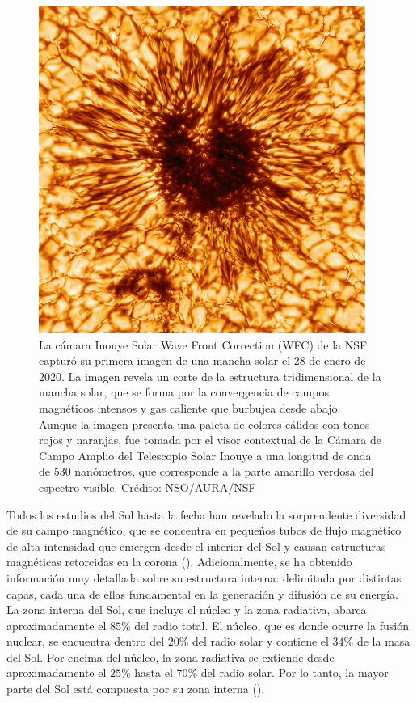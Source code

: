 \begin{figure}
    \centering
    \includegraphics[width=0.6\linewidth]{Figs/sunspot_small.png}
    \caption{La cámara Inouye Solar Wave Front Correction (WFC) de la NSF capturó su primera imagen de una mancha solar el 28 de enero de 2020. La imagen revela un corte de la estructura tridimensional de la mancha solar, que se forma por la convergencia de campos magnéticos intensos y gas caliente que burbujea desde abajo. Aunque la imagen presenta una paleta de colores cálidos con tonos rojos y naranjas, fue tomada por el visor contextual de la Cámara de Campo Amplio del Telescopio Solar Inouye a una longitud de onda de 530 nanómetros, que corresponde a la parte amarillo verdosa del espectro visible. Crédito: NSO/AURA/NSF}
    \label{fig:sunspotNSO}
\end{figure}

Todos los estudios del Sol hasta la fecha han revelado la sorprendente diversidad de su campo magnético, que se concentra en pequeños tubos de flujo magnético de alta intensidad que emergen desde el interior del Sol y causan estructuras magnéticas retorcidas en la corona (\cite{schrijver_2009}). Adicionalmente, se ha obtenido información muy detallada sobre su estructura interna: delimitada por distintas capas, cada una de ellas fundamental en la generación y difusión de su energía. La zona interna del Sol, que incluye el núcleo y la zona radiativa, abarca aproximadamente el $85\%$ del radio total. El núcleo, que es donde ocurre la fusión nuclear, se encuentra dentro del $20\%$ del radio solar y contiene el $34\%$ de la masa del Sol. Por encima del núcleo, la zona radiativa se extiende desde aproximadamente el $25\%$ hasta el $70\%$ del radio solar. Por lo tanto, la mayor parte del Sol está compuesta por su zona interna (\cite{Hanslmeier_2023}). 

